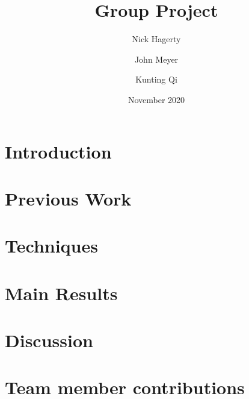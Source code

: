 \documentclass{article}
\title{Group Project}
\author{
    Nick Hagerty
    \and
    John Meyer
    \and
    Kunting Qi
}
\date{November 2020}
\begin{document}
\maketitle

\section{Introduction}

\section{Previous Work}

\section{Techniques}

\section{Main Results}

\section{Discussion}

\section{Team member contributions}

\newpage


\end{document}
